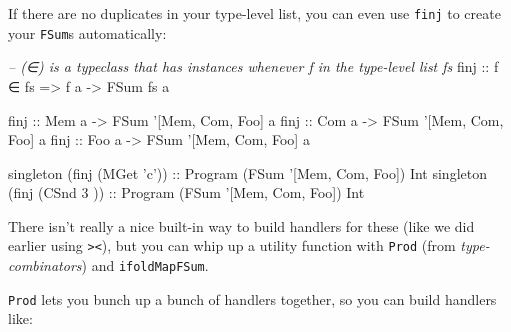 \documentclass[]{article}
\newenvironment{Shaded}{}{}
\newcommand{\CharTok}[1]{\textcolor[rgb]{0.25,0.44,0.63}{#1}}
\newcommand{\CommentTok}[1]{\textcolor[rgb]{0.38,0.63,0.69}{\textit{#1}}}
\newcommand{\DataTypeTok}[1]{\textcolor[rgb]{0.56,0.13,0.00}{#1}}
\newcommand{\DecValTok}[1]{\textcolor[rgb]{0.25,0.63,0.44}{#1}}
\newcommand{\FunctionTok}[1]{\textcolor[rgb]{0.02,0.16,0.49}{#1}}
\newcommand{\KeywordTok}[1]{\textcolor[rgb]{0.00,0.44,0.13}{\textbf{#1}}}
\newcommand{\NormalTok}[1]{#1}
\newcommand{\OtherTok}[1]{\textcolor[rgb]{0.00,0.44,0.13}{#1}}
\begin{document}
If there are no duplicates in your type-level list, you can even use
\texttt{finj} to create your \texttt{FSum}s automatically:

\begin{Shaded}
\begin{Highlighting}[]
\CommentTok{-- (∈) is a typeclass that has instances whenever f in the type-level list fs}
\OtherTok{finj ::}\NormalTok{ f ∈ fs }\OtherTok{=>}\NormalTok{ f a }\OtherTok{->} \DataTypeTok{FSum}\NormalTok{ fs a}

\OtherTok{finj ::} \DataTypeTok{Mem}\NormalTok{ a }\OtherTok{->} \DataTypeTok{FSum} \CharTok{'[Mem, Com, Foo] a}
\OtherTok{finj ::} \DataTypeTok{Com}\NormalTok{ a }\OtherTok{->} \DataTypeTok{FSum} \CharTok{'[Mem, Com, Foo] a}
\OtherTok{finj ::} \DataTypeTok{Foo}\NormalTok{ a }\OtherTok{->} \DataTypeTok{FSum} \CharTok{'[Mem, Com, Foo] a}

\NormalTok{singleton (finj (}\DataTypeTok{MGet} \CharTok{'c'}\NormalTok{))}\OtherTok{ ::} \DataTypeTok{Program}\NormalTok{ (}\DataTypeTok{FSum} \CharTok{'[Mem, Com, Foo]) Int}
\NormalTok{singleton (finj (}\DataTypeTok{CSnd} \DecValTok{3}\NormalTok{  ))}\OtherTok{ ::} \DataTypeTok{Program}\NormalTok{ (}\DataTypeTok{FSum} \CharTok{'[Mem, Com, Foo]) Int}
\end{Highlighting}
\end{Shaded}

There isn't really a nice built-in way to build handlers for these (like we did
earlier using \texttt{\textgreater{}\textbar{}\textless{}}), but you can whip up
a utility function with \texttt{Prod} (from \emph{type-combinators}) and
\texttt{ifoldMapFSum}.

\begin{Shaded}
\end{Shaded}

\texttt{Prod} lets you bunch up a bunch of handlers together, so you can build
handlers like:
\end{document}
